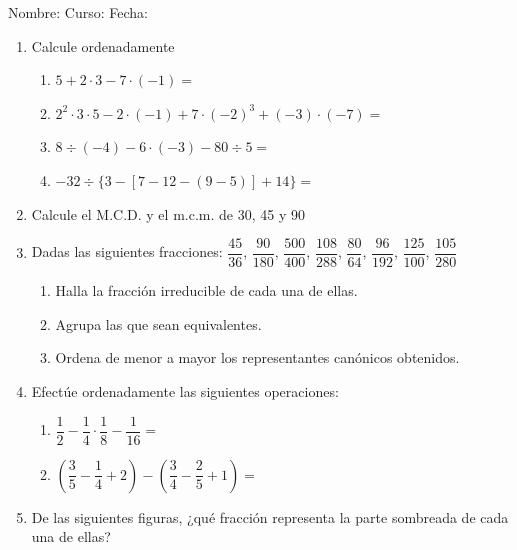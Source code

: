 \documentclass[fleqn]{article}
\newcommand{\LineaNombre}{%
\par
\vspace{\baselineskip}
Nombre:\hrulefill \; Curso: \underline{\hspace*{48pt}} \; Fecha: \underline{\hspace*{2.5cm}} \relax
\par}
\begin{document}
\LineaNombre
\begin{enumerate}
 \item Calcule ordenadamente
 \begin{enumerate}
 \item $5+2\cdot 3-7\cdot (-1)=$\noanswer[.2in]
 \item $2^{2}\cdot 3\cdot 5-2\cdot (-1)+7\cdot (-2)^{3}+(-3)\cdot (-7)=$\noanswer[.2in]
 \item $8\div (-4)-6\cdot (-3)-80\div 5 =$\noanswer[.2in]
 \item $-32\div \{3-[7-12-(9-5)]+14\}=$\noanswer[.2in]
 \end{enumerate}
 \item Calcule el M.C.D. y el m.c.m. de 30, 45 y 90 \noanswer[.75in]
 \item Dadas las siguientes fracciones: $\dfrac{45}{36}$, $\dfrac{90}{180}$, $\dfrac{500}{400}$, $\dfrac{108}{288}$, $\dfrac{80}{64}$, $\dfrac{96}{192}$, $\dfrac{125}{100}$, $\dfrac{105}{280}$
 \begin{enumerate}
 \item Halla la fracción irreducible de cada una de ellas.
 \item Agrupa las que sean equivalentes.
 \item Ordena de menor a mayor los representantes canónicos obtenidos.
 \end{enumerate}
 \noanswer
  \newpage
 \item Efectúe ordenadamente las siguientes operaciones:
 \begin{enumerate}
 \item $\dfrac{1}{2}-\dfrac{1}{4}\cdot \dfrac{1}{8}-\dfrac{1}{16}=$\noanswer[.5in]
 \item $\left(\dfrac{3}{5}-\dfrac{1}{4}+2\right)-\left(\dfrac{3}{4}-\dfrac{2}{5}+1\right)=$\noanswer[.5in]
 \end{enumerate}
 \item De las siguientes figuras, ¿qué fracción representa la parte sombreada de cada una de ellas?
 \begin{enumerate}
\end{enumerate}
\end{enumerate}
\end{document}
